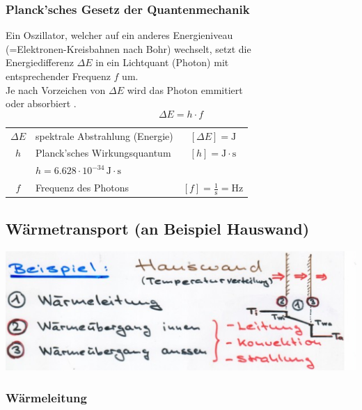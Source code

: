 \subsubsection{Planck'sches Gesetz der Quantenmechanik}

Ein Oszillator, welcher auf ein anderes Energieniveau  \\
(=Elektronen-Kreisbahnen nach Bohr) wechselt, setzt die \\
Energiedifferenz $\Delta E$ in ein Lichtquant (Photon) mit \\
entsprechender Frequenz $f$ um. \\
Je nach Vorzeichen von $\Delta E$ wird das Photon emmitiert  \\
oder absorbiert . \\

$$ \boxed { \Delta E = h \cdot f }  $$

\begin{tabular}{c l c}
	$\Delta E$ & spektrale Abstrahlung (Energie) & $[\Delta E] = \mathrm{J}$ \\
	$h$ & Planck'sches Wirkungsquantum & $[h] = \mathrm{J \cdot s} $\\
	&  $h = 6.628 \cdot 10^{-34} \, \mathrm{J \cdot s}$ &  \\
	\rule{0pt}{8pt}$f$ & Frequenz des Photons & $ [f] = \mathrm{\frac{1}{s} = Hz}$ \\
\end{tabular}





\subsection{Wärmetransport (an Beispiel Hauswand)}


\includegraphics[width=0.9\linewidth]{Bilder/Waermetransport} \\


\subsubsection{Wärmeleitung}

